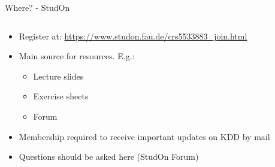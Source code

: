 \begin{frame}{Where? - StudOn}
	\begin{columns}
		\begin{column}{0.7\textwidth}
			\begin{itemize}
				\item Register at: \url{https://www.studon.fau.de/crs5533883_join.html}
				\item Main source for resources. E.g.:
				      \begin{itemize}
					      \item Lecture slides
					      \item Exercise sheets
					      \item Forum
				      \end{itemize}
				\item Membership required to receive important updates on KDD by mail
				\item Questions should be asked here (StudOn Forum)

			\end{itemize}
		\end{column}
		\begin{column}{0.3\textwidth}
			\begin{center}
			\end{center}
		\end{column}
	\end{columns}

\end{frame}


